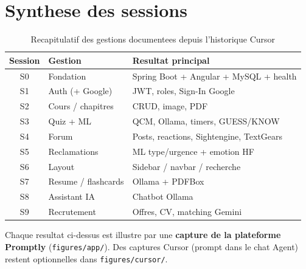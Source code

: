 \section{Synthese des sessions}

\begin{table}[H]
\centering
\begin{tabular}{@{}clp{7.5cm}@{}}
\toprule
Session & Gestion & Resultat principal \\
\midrule
S0 & Fondation & Spring Boot + Angular + MySQL + health \\
S1 & Auth (+ Google) & JWT, roles, Sign-In Google \\
S2 & Cours / chapitres & CRUD, image, PDF \\
S3 & Quiz + ML & QCM, Ollama, timers, GUESS/KNOW \\
S4 & Forum & Posts, reactions, Sightengine, TextGears \\
S5 & Reclamations & ML type/urgence + emotion HF \\
S6 & Layout & Sidebar / navbar / recherche \\
S7 & Resume / flashcards & Ollama + PDFBox \\
S8 & Assistant IA & Chatbot Ollama \\
S9 & Recrutement & Offres, CV, matching Gemini \\
\bottomrule
\end{tabular}
\caption{Recapitulatif des gestions documentees depuis l'historique Cursor}
\end{table}

Chaque resultat ci-dessus est illustre par une \textbf{capture de la
plateforme Promptly} (\texttt{figures/app/}). Des captures Cursor
(prompt dans le chat Agent) restent optionnelles dans
\texttt{figures/cursor/}.
